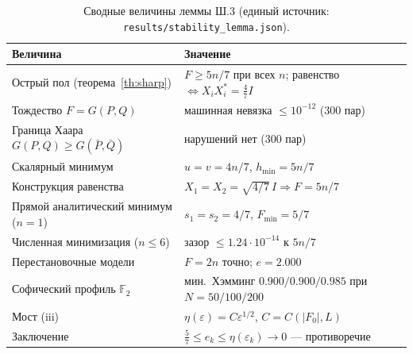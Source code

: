 \documentclass[11pt,a4paper]{article}
\theoremstyle{plain}
\theoremstyle{definition}
\theoremstyle{remark}
\begin{document}
\begin{table}[h]
\centering\small
\caption{Сводные величины леммы Ш.3 (единый источник:
\texttt{results/stability\_lemma.json}).}
\begin{tabularx}{0.94\textwidth}{l Y}
\toprule
Величина & Значение \\
\midrule
{}
Острый пол (теорема~\ref{th:sharp}) & $F\ge 5n/7$ при всех $n$;
равенство $\Leftrightarrow X_iX_i^*=\frac47I$ \\
Тождество $F=G(P,Q)$ & машинная невязка $\le 10^{-12}$ (300 пар) \\
Граница Хаара $G(P,Q)\ge G(\bar P,\bar Q)$ & нарушений нет (300 пар) \\
Скалярный минимум & $u=v=4n/7$, $h_{\min}=5n/7$ \\
Конструкция равенства & $X_1=X_2=\sqrt{4/7}\,I\Rightarrow F=5n/7$ \\
Прямой аналитический минимум ($n=1$) & $s_1=s_2=4/7$, $F_{\min}=5/7$ \\
Численная минимизация ($n\le 6$) & зазор $\le 1.24\cdot 10^{-14}$ к $5n/7$ \\
Перестановочные модели & $F=2n$ точно; $e=2.000$ \\
Софический профиль $\mathbb{F}_2$ & мин.\ Хэмминг $0.900/0.900/0.985$
при $N=50/100/200$ \\
Мост (iii) & $\eta(\varepsilon)=C\varepsilon^{1/2}$, $C=C(|F_0|,L)$ \\
Заключение & $\tfrac57\le e_k\le\eta(\varepsilon_k)\to 0$ — противоречие \\
\bottomrule
\end{tabularx}
\end{table}
\end{document}
